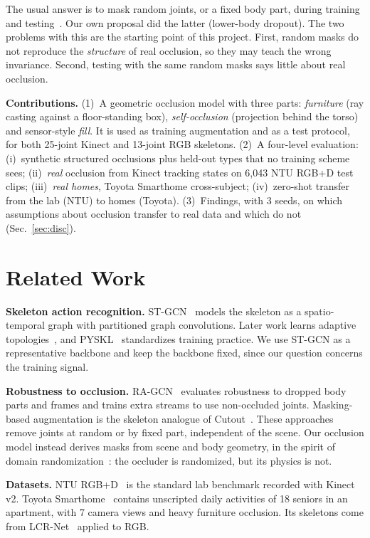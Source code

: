 \documentclass[11pt,twocolumn,letterpaper]{article}
\begin{document}
The usual answer is to mask random joints, or a fixed body part, during training and testing~\cite{song2020ragcn}.
Our own proposal did the latter (lower-body dropout).
The two problems with this are the starting point of this project.
First, random masks do not reproduce the \emph{structure} of real occlusion, so they may teach the wrong invariance.
Second, testing with the same random masks says little about real occlusion.

\textbf{Contributions.}
(1)~A geometric occlusion model with three parts: \emph{furniture} (ray casting against a floor-standing box), \emph{self-occlusion} (projection behind the torso) and sensor-style \emph{fill}. It is used as training augmentation and as a test protocol, for both 25-joint Kinect and 13-joint RGB skeletons.
(2)~A four-level evaluation:
(i)~synthetic structured occlusions plus held-out types that no training scheme sees;
(ii)~\emph{real} occlusion from Kinect tracking states on 6{,}043 NTU RGB+D test clips;
(iii)~\emph{real homes}, Toyota Smarthome cross-subject;
(iv)~zero-shot transfer from the lab (NTU) to homes (Toyota).
(3)~Findings, with 3 seeds, on which assumptions about occlusion transfer to real data and which do not (Sec.~\ref{sec:disc}).

\section{Related Work}
\textbf{Skeleton action recognition.}
ST-GCN~\cite{yan2018stgcn} models the skeleton as a spatio-temporal graph with partitioned graph convolutions.
Later work learns adaptive topologies~\cite{shi2019agcn,chen2021ctrgcn}, and PYSKL~\cite{duan2022pyskl} standardizes training practice.
We use ST-GCN as a representative backbone and keep the backbone fixed, since our question concerns the training signal.

\textbf{Robustness to occlusion.}
RA-GCN~\cite{song2020ragcn} evaluates robustness to dropped body parts and frames and trains extra streams to use non-occluded joints.
Masking-based augmentation is the skeleton analogue of Cutout~\cite{devries2017cutout}.
These approaches remove joints at random or by fixed part, independent of the scene.
Our occlusion model instead derives masks from scene and body geometry, in the spirit of domain randomization~\cite{tobin2017domain}: the occluder is randomized, but its physics is not.

\textbf{Datasets.}
NTU RGB+D~\cite{shahroudy2016ntu} is the standard lab benchmark recorded with Kinect v2.
Toyota Smarthome~\cite{das2019toyota} contains unscripted daily activities of 18 seniors in an apartment, with 7 camera views and heavy furniture occlusion.
Its skeletons come from LCR-Net~\cite{rogez2019lcrnet} applied to RGB.
\end{document}
